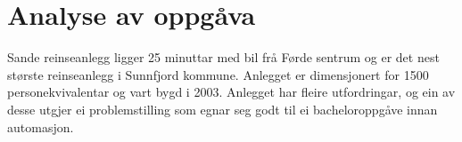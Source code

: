 \chapter{Analyse av oppgåva}
\thispagestyle{fancy}
Sande reinseanlegg ligger 25 minuttar med bil frå Førde sentrum og er det 
nest største reinseanlegg i Sunnfjord kommune. Anlegget er dimensjonert for 1500 personekvivalentar
og vart bygd i 2003. Anlegget har fleire utfordringar, og ein av desse utgjer ei problemstilling som egnar seg godt til ei
bacheloroppgåve innan automasjon.